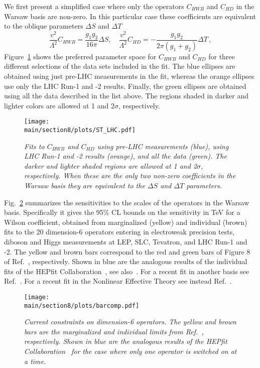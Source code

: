 \documentclass[../report.tex]{subfiles}
\providecommand{\main}{..}
\begin{document}
We first present a simplified case where only the operators $C_{HWB}$ and $C_{HD}$ in the Warsaw basis are non-zero.
In this particular case these coefficients are equivalent to the oblique parameters $\Delta S$ and $\Delta T$~\cite{Grinstein:1991cd}
\begin{equation}
\frac{v^2}{\Lambda^2} C_{HWB} = \frac{g_1 g_2}{16 \pi} \Delta S, \quad \frac{v^2}{\Lambda^2} C_{HD} = - \frac{g_1 g_2}{2 \pi \left(g_1 + g_2\right)} \Delta T \, ,
\end{equation}
Figure~\ref{fig8:SandT} shows the preferred parameter space for 
$C_{HWB}$ and $C_{HD}$ for three different selections of the data sets included in the fit.
The blue ellipses are obtained using just pre-LHC measurements in the fit, 
whereas the orange ellipses use only the LHC Run-1 and -2 results.
Finally, the green ellipses are obtained using all the data described in the list above.
The regions shaded in darker and lighter colors are allowed at 1 and 2$\sigma$, respectively. 
\begin{figure}[ht!]
  \centering
\texttt{[image: \\main/section8/plots/ST\_LHC.pdf]}
 \caption{\it Fits to $C_{HWB}$ and $C_{HD}$ using pre-LHC measurements (blue), using LHC Run-1 and -2 results (orange), and all the data (green). The darker and lighter shaded regions are allowed at 1 and 2$\sigma$, respectively. When these are the only two non-zero coefficients in the Warsaw basis they are equivalent to the $\Delta S$ and $\Delta T$ parameters. }
   \label{fig8:SandT}
\end{figure}

Fig.~\ref{fig8:HEPfitvsEMSY} summarizes the sensitivities to the scales of the operators in the Warsaw basis.
Specifically it gives the 95\% CL bounds on the sensitivity in TeV for a Wilson coefficient, obtained from marginalized (yellow) and individual (brown) fits to the 20 dimension-6 operators entering in electroweak precision tests, diboson and Higgs measurements at LEP, SLC, Tevatron, and LHC Run-1 and -2.
The yellow and brown bars correspond to the red and green bars of Figure 8 of Ref.~\cite{Ellis:2018gqa}, respectively.
Shown in blue are the analogous results of the individual fits of the HEPfit Collaboration~\cite{Ciuchini:2013pca, deBlas:2016ojx}, see also~\cite{luca:talk, otto:talk}.
For a recent fit in another basis see Ref.~\cite{Alves:2018nof}.
For a recent fit in the Nonlinear Effective Theory see instead Ref.~\cite{deBlas:2018tjm}.
\begin{figure}[h]
  \centering
\texttt{[image: \\main/section8/plots/barcomp.pdf]}
 \caption{\it Current constraints on dimension-6 operators. The yellow and brown bars are the marginalized and individual limits from Ref.~\cite{Ellis:2018gqa}, respectively. Shown in blue are the analogous results of the HEPfit Collaboration~\cite{Ciuchini:2013pca, deBlas:2016ojx} for the case where only one operator is switched on at a time.}
   \label{fig8:HEPfitvsEMSY}
\end{figure} 
\end{document}
